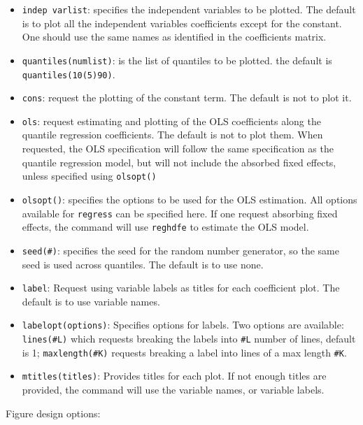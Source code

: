 \documentclass[bib]{statapress}
\providecommand{\tightlist}{%
  \setlength{\itemsep}{0pt}\setlength{\parskip}{0pt}}\usepackage{longtable,booktabs,array}
\begin{document}
\begin{itemize}
\tightlist
\item
  \texttt{indep\ varlist}: specifies the independent variables to be
  plotted. The default is to plot all the independent variables
  coefficients except for the constant. One should use the same names as
  identified in the coefficients matrix.
\item
  \texttt{quantiles(numlist)}: is the list of quantiles to be plotted.
  the default is \texttt{quantiles(10(5)90)}.
\item
  \texttt{cons}: request the plotting of the constant term. The default
  is not to plot it.
\item
  \texttt{ols}: request estimating and plotting of the OLS coefficients
  along the quantile regression coefficients. The default is not to plot
  them. When requested, the OLS specification will follow the same
  specification as the quantile regression model, but will not include
  the absorbed fixed effects, unless specified using \texttt{olsopt()}
\item
  \texttt{olsopt()}: specifies the options to be used for the OLS
  estimation. All options available for \texttt{regress} can be
  specified here. If one request absorbing fixed effects, the command
  will use \texttt{reghdfe} to estimate the OLS model.
\item
  \texttt{seed(\#)}: specifies the seed for the random number generator,
  so the same seed is used across quantiles. The default is to use none.
\item
  \texttt{label}: Request using variable labels as titles for each
  coefficient plot. The default is to use variable names.\\
\item
  \texttt{labelopt(options)}: Specifies options for labels. Two options
  are available: \texttt{lines(\#L)} which requests breaking the labels
  into \texttt{\#L} number of lines, default is 1;
  \texttt{maxlength(\#K)} requests breaking a label into lines of a max
  length \texttt{\#K}.
\item
  \texttt{mtitles(titles)}: Provides titles for each plot. If not enough
  titles are provided, the command will use the variable names, or
  variable labels.
\end{itemize}

Figure design options:
\end{document}
